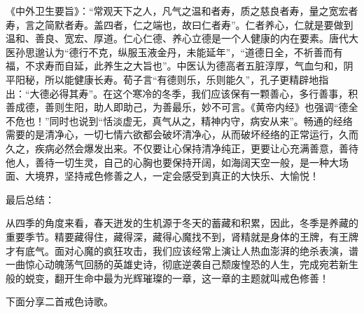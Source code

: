 《中外卫生要旨》：“常观天下之人，凡气之温和者寿，质之慈良者寿，量之宽宏者寿，言之简默者寿。盖四者，仁之端也，故曰仁者寿”。仁者养心，仁就是要做到温和、善良、宽宏、厚道。仁心仁德、养心立德是一个人健康的内在要素。唐代大医孙思邈认为“德行不克，纵服玉液金丹，未能延年”，“道德日全，不祈善而有福，不求寿而自延，此养生之大旨也”。中医认为德高者五脏淳厚，气血匀和，阴平阳秘，所以能健康长寿。荀子言“有德则乐，乐则能久”，孔子更精辟地指出：“大德必得其寿”。在这个寒冷的冬季，我们应该保有一颗善心，多行善事，积善成德，善则生阳，助人即助己，为善最乐，妙不可言。《黄帝内经》也强调“德全不危也！”同时也说到“恬淡虚无，真气从之，精神内守，病安从来”。畅通的经络需要的是清净心，一切七情六欲都会破坏清净心，从而破坏经络的正常运行，久而久之，疾病必然会爆发出来。不仅要让心保持清净纯正，更要让心充满善意，善待他人，善待一切生灵，自己的心胸也要保持开阔，如海阔天空一般，是一种大场面、大境界，坚持戒色修善之人，一定会感受到真正的大快乐、大愉悦！

最后总结：

从四季的角度来看，春天迸发的生机源于冬天的蓄藏和积累，因此，冬季是养藏的重要季节。精要藏得住，藏得深，藏得心魔找不到，肾精就是身体的王牌，有王牌才有底气。面对心魔的疯狂攻击，我们应该经常上演让人热血澎湃的绝杀表演，谱一曲惊心动魄荡气回肠的英雄史诗，彻底逆袭自己颓废惶恐的人生，完成宛若新生般的蜕变，翻开生命中最为光辉璀璨的一章，这一章的主题就叫戒色修善！

下面分享二首戒色诗歌。

